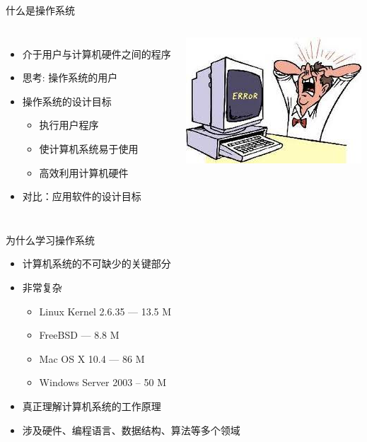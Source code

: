 \documentclass[xcolor=svgnames]{beamer}
\begin{document}
\begin{CJK*}{UTF8}{gbsn}
\begin{frame}{什么是操作系统}
\begin{columns}%
\begin{itemize}
\item 介于\alert{用户}与计算机硬件之间的程序 
\item 思考: 操作系统的用户
\item 操作系统的设计目标
\begin{itemize}
\item 执行用户程序
\item 使计算机系统易于使用
\item 高效利用计算机硬件
\end{itemize}
\item 对比：应用软件的设计目标
\end{itemize}
\includegraphics[width=.9\textwidth]{frustrated-user.jpeg}
\end{columns}
\end{frame}

\begin{frame}{为什么学习操作系统}
\begin{itemize}
\item 计算机系统的不可缺少的关键部分
\item 非常复杂 
\begin{itemize}
\item Linux Kernel 2.6.35 --- 13.5 M
\item FreeBSD --- 8.8 M 
\item Mac OS X 10.4 --- 86 M 
\item Windows Server 2003 -- 50 M
\end{itemize}
\item 真正理解计算机系统的工作原理
\item 涉及硬件、编程语言、数据结构、算法等多个领域
\end{itemize}
\end{frame}


\end{CJK*}
\end{document}
